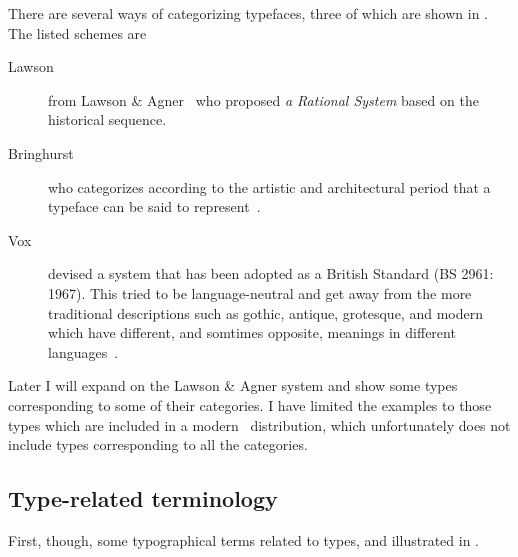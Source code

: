 \documentclass[10pt,letterpaper,extrafontsizes]{memoir}
\begin{document}
    There are several ways of categorizing typefaces, three of which are
shown in . The listed schemes are
\begin{description}
\item[Lawson] from 
Lawson \& Agner~\autocite{LAWSONAGNER90} who proposed  
\emph{a Rational System} based on the historical sequence.
\item[Bringhurst] who categorizes according to the artistic and architectural
period that a typeface can be said to represent~\autocite{BRINGHURST99}.
\item[Vox] devised a system that has been adopted as a British Standard 
(BS 2961: 1967). This tried to be language-neutral and get away from
the more traditional descriptions such as gothic, antique, grotesque, and 
modern which have different, and somtimes opposite, meanings in different
languages~\autocite{MCLEAN80}.
\end{description}
Later I will expand on the Lawson \& Agner system and show some types 
corresponding to some of their categories. I have limited the examples to 
those types which are included in a modern \ltx\ 
distribution, 
which unfortunately does not include types corresponding to all the 
categories.


\subsection{Type-related terminology}

    First, though, some typographical terms related to types, and illustrated 
in \fref{fig:typeterms}. 
\end{document}
